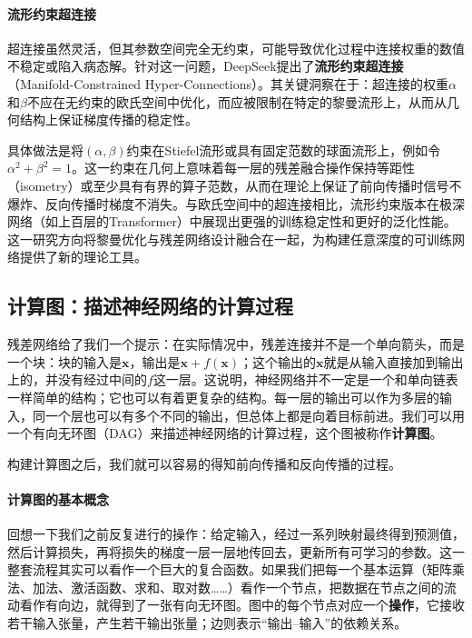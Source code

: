 \paragraph{流形约束超连接}

超连接虽然灵活，但其参数空间完全无约束，可能导致优化过程中连接权重的数值不稳定或陷入病态解。针对这一问题，DeepSeek提出了\textbf{流形约束超连接}（Manifold-Constrained Hyper-Connections）\cite{xie2026mhcmanifoldconstrainedhyperconnections}。其关键洞察在于：超连接的权重$\alpha$和$\beta$不应在无约束的欧氏空间中优化，而应被限制在特定的黎曼流形上，从而从几何结构上保证梯度传播的稳定性。

具体做法是将$(\alpha, \beta)$约束在Stiefel流形或具有固定范数的球面流形上，例如令$\alpha^2 + \beta^2 = 1$。这一约束在几何上意味着每一层的残差融合操作保持等距性（isometry）或至少具有有界的算子范数，从而在理论上保证了前向传播时信号不爆炸、反向传播时梯度不消失\cite{xie2026mhcmanifoldconstrainedhyperconnections}。与欧氏空间中的超连接相比，流形约束版本在极深网络（如上百层的Transformer）中展现出更强的训练稳定性和更好的泛化性能。这一研究方向将黎曼优化与残差网络设计融合在一起，为构建任意深度的可训练网络提供了新的理论工具。

\subsection{计算图：描述神经网络的计算过程}

残差网络给了我们一个提示：在实际情况中，残差连接并不是一个单向箭头，而是一个块：块的输入是$\mathbf{x}$，输出是$\mathbf{x}+f(\mathbf{x})$；这个输出的$\mathbf{x}$就是从输入直接加到输出上的，并没有经过中间的$f$这一层。这说明，神经网络并不一定是一个和单向链表一样简单的结构；它也可以有着更复杂的结构。每一层的输出可以作为多层的输入，同一个层也可以有多个不同的输出，但总体上都是向着目标前进。我们可以用一个有向无环图（DAG）来描述神经网络的计算过程，这个图被称作\textbf{计算图}。

构建计算图之后，我们就可以容易的得知前向传播和反向传播的过程。

\paragraph{计算图的基本概念}

回想一下我们之前反复进行的操作：给定输入，经过一系列映射最终得到预测值，然后计算损失，再将损失的梯度一层一层地传回去，更新所有可学习的参数。这一整套流程其实可以看作一个巨大的复合函数。如果我们把每一个基本运算（矩阵乘法、加法、激活函数、求和、取对数……）看作一个节点，把数据在节点之间的流动看作有向边，就得到了一张有向无环图。图中的每个节点对应一个\textbf{操作}，它接收若干输入张量，产生若干输出张量；边则表示“输出–输入”的依赖关系。

